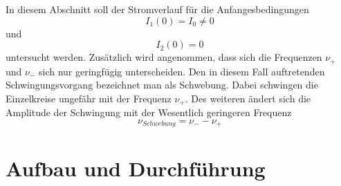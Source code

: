 \documentclass[11pt,ngerman,a4paper]{article}
\begin{document}
\noindent
In diesem Abschnitt soll der Stromverlauf für die Anfangesbedingungen
\[
I_1(0) = I_0 \neq 0
\] 
und 
\[
I_2(0) = 0
\]
untersucht werden. Zusätzlich wird angenommen, dass sich die Frequenzen $\nu_+$  und $\nu_-$ sich nur geringfügig unterscheiden. Den in diesem Fall auftretenden Schwingungsvorgang bezeichnet man als Schwebung. Dabei schwingen die Einzelkreise ungefähr mit der Frequenz $\nu_+$. Des weiteren ändert sich die Amplitude der Schwingung mit der Wesentlich geringeren Frequenz 
\begin{equation}
\nu_{Schwebung} = \nu_- - \nu_+
\end{equation}

\section{Aufbau und Durchf\"{u}hrung}
\end{document}
